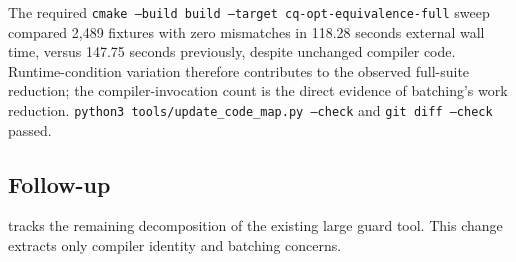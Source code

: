 The required \texttt{cmake --build build --target cq-opt-equivalence-full}
sweep compared 2,489 fixtures with zero mismatches in 118.28 seconds external
wall time, versus 147.75 seconds previously, despite unchanged compiler code.
Runtime-condition variation therefore contributes to the observed full-suite
reduction; the compiler-invocation count is the direct evidence of batching's
work reduction. \texttt{python3 tools/update\_code\_map.py --check} and
\texttt{git diff --check} passed.

\subsection*{Follow-up}
 tracks the remaining decomposition of the
existing large guard tool. This change extracts only compiler identity and
batching concerns.
